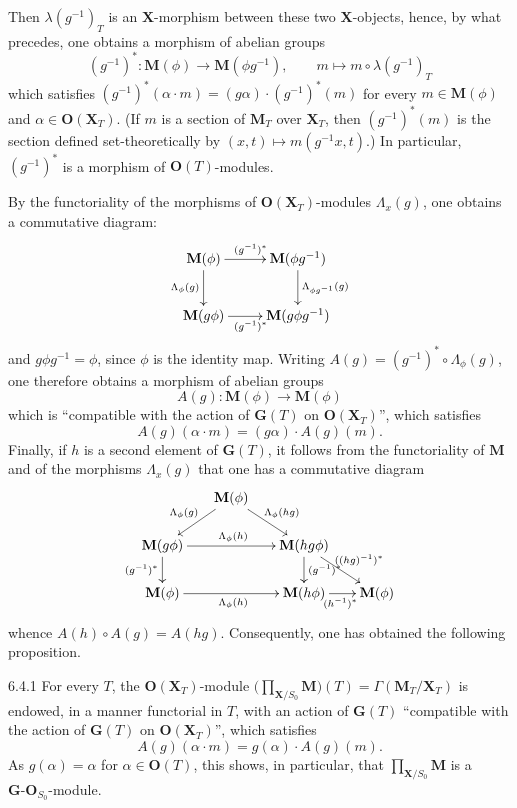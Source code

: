 Then \(\lambda(g^{-1})_{T}\) is an \(\mathbf{X}\)-morphism between these two
\(\mathbf{X}\)-objects, hence, by what precedes, one obtains a morphism of
abelian groups
\[
(g^{-1})^{*}\colon\mathbf{M}(\phi)\longrightarrow\mathbf{M}(\phi g^{-1}),
  \qquad m\mapsto m\circ\lambda(g^{-1})_{T}
\]
which satisfies \((g^{-1})^{*}(\alpha\cdot m)=(g\alpha)\cdot(g^{-1})^{*}(m)\)
for every \(m\in\mathbf{M}(\phi)\) and \(\alpha\in\mathbf{O}(\mathbf{X}_{T})\).
(If \(m\) is a section of \(\mathbf{M}_{T}\) over \(\mathbf{X}_{T}\), then
\((g^{-1})^{*}(m)\) is the section defined set-theoretically by
\((x,t)\mapsto m(g^{-1}x,t)\).) In particular, \((g^{-1})^{*}\) is a morphism
of \(\mathbf{O}(T)\)-modules.

By the functoriality of the morphisms of \(\mathbf{O}(\mathbf{X}_{T})\)-modules
\(\Lambda_{x}(g)\), one obtains a commutative diagram:
\[
\xymatrix{
\mathbf{M}(\phi) \ar[r]^{(g^{-1})^{*}} \ar[d]_{\Lambda_{\phi}(g)}
  & \mathbf{M}(\phi g^{-1}) \ar[d]^{\Lambda_{\phi g^{-1}}(g)} \\
\mathbf{M}(g\phi) \ar[r]_{(g^{-1})^{*}}
  & \mathbf{M}(g\phi g^{-1})
}
\]
and \(g\phi g^{-1}=\phi\), since \(\phi\) is the identity map. Writing
\(A(g)=(g^{-1})^{*}\circ\Lambda_{\phi}(g)\), one therefore obtains a
morphism of abelian groups
\[
A(g)\colon\mathbf{M}(\phi)\longrightarrow\mathbf{M}(\phi)
\]
which is ``compatible with the action of \(\mathbf{G}(T)\) on
\(\mathbf{O}(\mathbf{X}_{T})\)'', \ie which satisfies
\[
A(g)(\alpha\cdot m)=(g\alpha)\cdot A(g)(m).
\]
Finally, if \(h\) is a second element of \(\mathbf{G}(T)\), it follows from
the functoriality of \(\mathbf{M}\) and of the morphisms \(\Lambda_{x}(g)\)
that one has a commutative diagram
\[
\xymatrix@C=1.6em@R=1.8em{
& \mathbf{M}(\phi) \ar[dl]_{\Lambda_{\phi}(g)} \ar[dr]^{\Lambda_{\phi}(hg)} & & \\
\mathbf{M}(g\phi) \ar[rr]^{\Lambda_{\phi}(h)} \ar[d]_{(g^{-1})^{*}}
  && \mathbf{M}(hg\phi) \ar[d]^{(g^{-1})^{*}} \ar[dr]^{((hg)^{-1})^{*}} & \\
\mathbf{M}(\phi) \ar[rr]_{\Lambda_{\phi}(h)}
  && \mathbf{M}(h\phi) \ar[r]_{(h^{-1})^{*}}
  & \mathbf{M}(\phi)
}
\]
whence \(A(h)\circ A(g)=A(hg)\). Consequently, one
has obtained the following proposition.

\begin{proposition}{6.4.1}\label{I.6.4.1}
For every \(T\), the \(\mathbf{O}(\mathbf{X}_{T})\)-module
\(\bigl(\prod_{\mathbf{X}/S_{0}}\mathbf{M}\bigr)(T)=\Gamma(\mathbf{M}_{T}/\mathbf{X}_{T})\)
is endowed, in a manner functorial in \(T\), with an action of
\(\mathbf{G}(T)\) ``compatible with the action of \(\mathbf{G}(T)\) on
\(\mathbf{O}(\mathbf{X}_{T})\)'', \ie which satisfies
\[
A(g)(\alpha\cdot m)=g(\alpha)\cdot A(g)(m).
\]
As \(g(\alpha)=\alpha\) for \(\alpha\in\mathbf{O}(T)\), this shows, in
particular, that \(\prod_{\mathbf{X}/S_{0}}\mathbf{M}\) is a
\(\mathbf{G}\text{-}\mathbf{O}_{S_{0}}\)-module.
\end{proposition}

